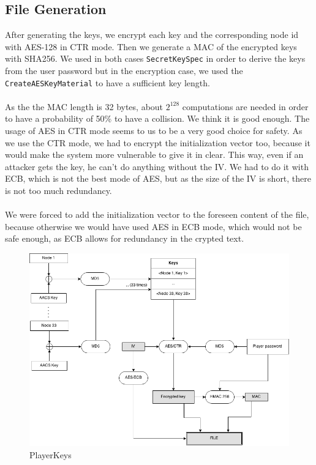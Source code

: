 \documentclass[a4paper,titlepage]{article}
\begin{document}
	\subsection{File Generation}
	After generating the keys, we encrypt each key and the corresponding node id with AES-128 in CTR mode. Then we generate a MAC of the encrypted keys with SHA256. We used in both cases \texttt{SecretKeySpec} in order to derive the keys from the user password but in the encryption case, we used the \texttt{CreateAESKeyMaterial} to have a sufficient key length. \\ \\ 
	As the the MAC length is 32 bytes, about $2^{128}$ computations are needed in order to have a probability of 50\% to have a collision. We think it is good enough.  The usage of AES in CTR mode seems to us to be a very good choice for safety. As we use the CTR mode, we had to encrypt the initialization vector too, because it would make the system more vulnerable to give it in clear. This way, even if an attacker gets the key, he can't do anything without the IV. We had to do it with ECB, which is not the best mode of AES, but as the size of the IV is short, there is not too much redundancy.  \\ \\
	We were forced to add the initialization vector to the foreseen content of the file, because otherwise we would have used AES in ECB mode, which would not be safe enough, as ECB allows for redundancy in the crypted text.

\begin{figure}
	\centering
	\includegraphics[scale=0.5]{PlayerKeys.png}
	\caption{PlayerKeys}
	\label{PlayerKeys}
\end{figure}
\end{document}
